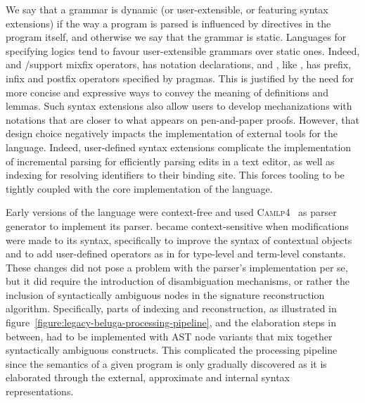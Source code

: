 We say that a grammar is dynamic (or user-extensible, or featuring syntax extensions) if the way a program is parsed is influenced by directives in the program itself, and otherwise we say that the grammar is static.
Languages for specifying logics tend to favour user-extensible grammars over static ones.
Indeed, \Agda and \Isabelle/\HOL support mixfix operators, \Coq has notation declarations, and \Beluga, like \Twelf, has prefix, infix and postfix operators specified by pragmas.
This is justified by the need for more concise and expressive ways to convey the meaning of definitions and lemmas.
Such syntax extensions also allow users to develop mechanizations with notations that are closer to what appears on pen-and-paper proofs.
However, that design choice negatively impacts the implementation of external tools for the language.
Indeed, user-defined syntax extensions complicate the implementation of incremental parsing for efficiently parsing edits in a text editor, as well as indexing for resolving identifiers to their binding site.
This forces tooling to be tightly coupled with the core implementation of the language.

Early versions of the \Beluga language were context-free and used \textsc{Camlp4}~\cite{de2003camlp4} as parser generator to implement its parser.
\Beluga became context-sensitive when modifications were made to its syntax, specifically to improve the syntax of contextual objects and to add user-defined operators as in \Twelf for \LF type-level and term-level constants.
These changes did not pose a problem with the parser's implementation per se, but it did require the introduction of disambiguation mechanisms, or rather the inclusion of syntactically ambiguous nodes in the signature reconstruction algorithm.
Specifically, parts of indexing and reconstruction, as illustrated in figure~\ref{figure:legacy-beluga-processing-pipeline}, and the elaboration steps in between, had to be implemented with \ac{AST} node variants that mix together syntactically ambiguous constructs.
This complicated the processing pipeline since the semantics of a given \Beluga program is only gradually discovered as it is elaborated through the external, approximate and internal syntax representations.


